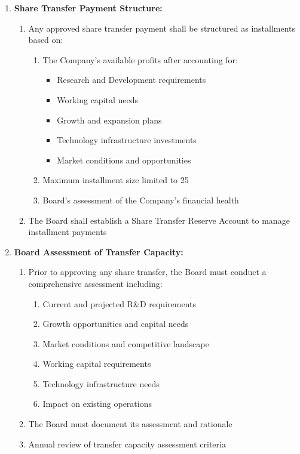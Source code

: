 \begin{enumerate}[label=(\alph*)]
\item \textbf{Share Transfer Payment Structure:}
    \begin{enumerate}[label=(\roman*)]
    \item Any approved share transfer payment shall be structured as installments based on:
        \begin{enumerate}[label=(\alph*)]
        \item The Company's available profits after accounting for:
            \begin{itemize}
            \item Research and Development requirements
            \item Working capital needs
            \item Growth and expansion plans
            \item Technology infrastructure investments
            \item Market conditions and opportunities
            \end{itemize}
        \item Maximum installment size limited to 25%
        \item Board's assessment of the Company's financial health
        \end{enumerate}
    \item The Board shall establish a Share Transfer Reserve Account to manage installment payments
    \end{enumerate}

\item \textbf{Board Assessment of Transfer Capacity:}
    \begin{enumerate}[label=(\roman*)]
    \item Prior to approving any share transfer, the Board must conduct a comprehensive assessment including:
        \begin{enumerate}[label=(\alph*)]
        \item Current and projected R\&D requirements
        \item Growth opportunities and capital needs
        \item Market conditions and competitive landscape
        \item Working capital requirements
        \item Technology infrastructure needs
        \item Impact on existing operations
        \end{enumerate}
    \item The Board must document its assessment and rationale
    \item Annual review of transfer capacity assessment criteria
    \end{enumerate}


\end{enumerate}
